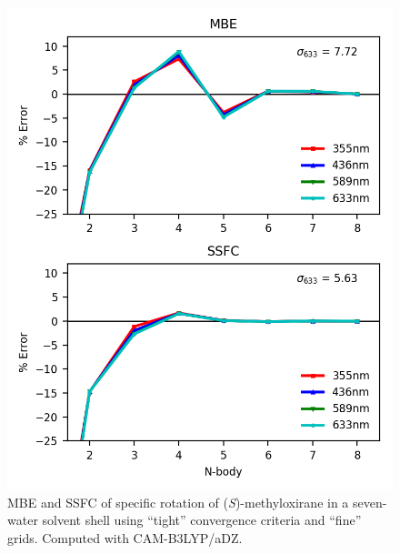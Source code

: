     \begin{figure}
        \centering
        \includegraphics[scale=0.75]{p1/graphs/si/metox_7_tight.png}
        \caption{MBE and SSFC of specific rotation of (\textit{S})-methyloxirane in a seven-water solvent shell using ``tight'' convergence criteria and ``fine'' grids. Computed with CAM-B3LYP/aDZ.}
        \label{metox7_tight.png}
      \end{figure}
